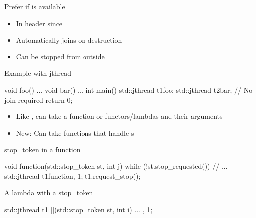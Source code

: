 \begin{frame}[fragile]
  \begin{goodpractice}{Prefer  if  is available}
    \begin{itemize}
    \item In  header since 
    \item Automatically joins on destruction
    \item Can be stopped from outside
    \end{itemize}
  \end{goodpractice}

  \begin{exampleblock}{Example with jthread}
    \begin{cppcode*}{}
      void foo() {...}
      void bar() {...}
      int main() {
        std::jthread t1{foo};
        std::jthread t2{bar};
        // No join required
        return 0;
      }
    \end{cppcode*}
  \end{exampleblock}
\end{frame}

\begin{frame}[fragile]
  \begin{block}{}
    \begin{itemize}
      \item Like ,  can take a function or functors/lambdas and their arguments
      \item New: Can take functions that handle s
    \end{itemize}
  \end{block}
  \begin{exampleblock}{stop\_token in a function}
    \begin{cppcode*}{}
    void function(std::stop_token st, int j) {
      while (!st.stop_requested()) {
        // ...
    }}
    std::jthread t1{function, 1};
    t1.request_stop();
    \end{cppcode*}
  \end{exampleblock}
  \begin{exampleblock}{A lambda with a stop\_token}
    \begin{cppcode*}{}
    std::jthread t1{
      [](std::stop_token st, int i){ ... }, 1};
    \end{cppcode*}
  \end{exampleblock}
\end{frame}


